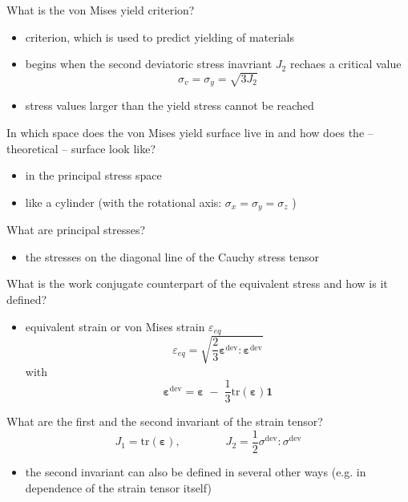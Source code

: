 \documentclass[english]{scrartcl}
\renewcommand{\vec}[1]{\boldsymbol{#1}}
\newcommand{\minus}{{\;} - {\;}}
\newcommand{\tr}{\text{tr}}
\newcommand{\dev}{\text{dev}}
\newenvironment{myitemize}{ \begin{itemize}
		\setlength{\itemsep}{0pt}
		\setlength{\parskip}{0pt}
		\setlength{\parsep}{0pt}     }
	{ \end{itemize}                  }
\begin{document}
What is the von Mises yield criterion?

\begin{myitemize}
	\item criterion, which is used to predict yielding of materials
	\item begins when the second deviatoric stress inavriant $ J_{2} $ rechaes a critical value
	\begin{equation*}
	\sigma_{v} = \sigma_{y} = \sqrt{3J_{2}}
	\end{equation*}
	\item stress values larger than the yield stress cannot be reached
\end{myitemize}

In which space does the von Mises yield surface live in and how does the -- theoretical -- surface look like?

\begin{myitemize}
	\item in the principal stress space
	\item like a cylinder (with the rotational axis: $ \sigma_{x} =  \sigma_{y} =  \sigma_{z} $ )
\end{myitemize}

What are principal stresses?

\begin{myitemize}
	\item the stresses on the diagonal line of the Cauchy stress tensor
\end{myitemize}

What is the work conjugate counterpart of the equivalent stress and how is it defined?

\begin{myitemize}
	\item equivalent strain or von Mises strain $ \varepsilon_{eq} $
	\begin{equation*}
		\varepsilon_{eq} = \sqrt{\dfrac{2}{3} \vec{\varepsilon}^{\text{dev}} : \vec{\varepsilon}^{\text{dev}}}
	\end{equation*}
	with 
	\begin{equation*}
		\vec{\varepsilon}^{\text{dev}} = \vec{\varepsilon} \minus \dfrac{1}{3} \text{tr}(\vec{\varepsilon}) \vec{1}
	\end{equation*}
\end{myitemize}

What are the first and the second invariant of the strain tensor?
	\begin{equation*}
		J_{1} = \tr (\vec{\varepsilon}), \qquad \qquad J_{2} = \dfrac{1}{2} \sigma^{\text{dev}} : \sigma^{\dev}
	\end{equation*}
\begin{myitemize}
	\item the second invariant can also be defined in several other ways (e.g. in dependence of the strain tensor itself)
\end{myitemize}
\end{document}
